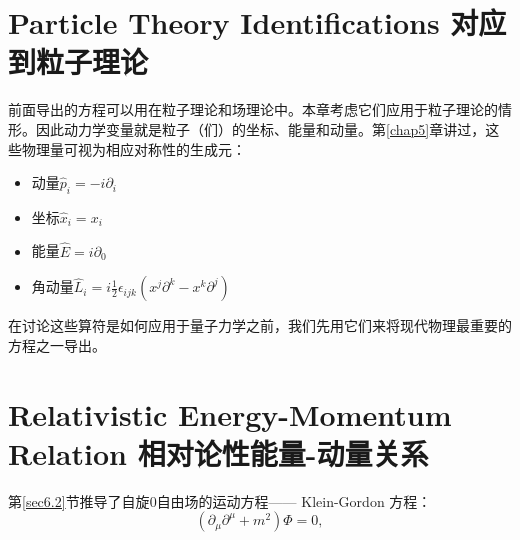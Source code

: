\section[对应到粒子理论]{Particle Theory Identifications \quad 对应到粒子理论}\label{sec8.1}
前面导出的方程可以用在粒子理论和场理论中。本章考虑它们应用于粒子理论的情形。因此动力学变量就是粒子（们）的坐标、能量和动量。第\ref{chap5}章讲过，这些物理量可视为相应对称性的生成元：
\begin{itemize}
\item 动量$\hat{p}_i=-i\partial_i$\\
\item 坐标$\hat{x}_i=x_i$\\
\item 能量$\hat{E}=i\partial_0$\\
\item 角动量$\hat{L}_i=i\frac{1}{2}\epsilon_{ijk}(x^j\partial^k-x^k\partial^j)$
\end{itemize}

在讨论这些算符是如何应用于量子力学之前，我们先用它们来将现代物理最重要的方程之一导出。
\section[相对论性能量-动量关系]{Relativistic Energy-Momentum Relation \quad 相对论性能量-动量关系}\label{sec8.2}
第\ref{sec6.2}节推导了自旋$0$自由场的运动方程—— Klein-Gordon 方程：
\[(\partial_\mu\partial^\mu+m^2)\Phi=0, \]

